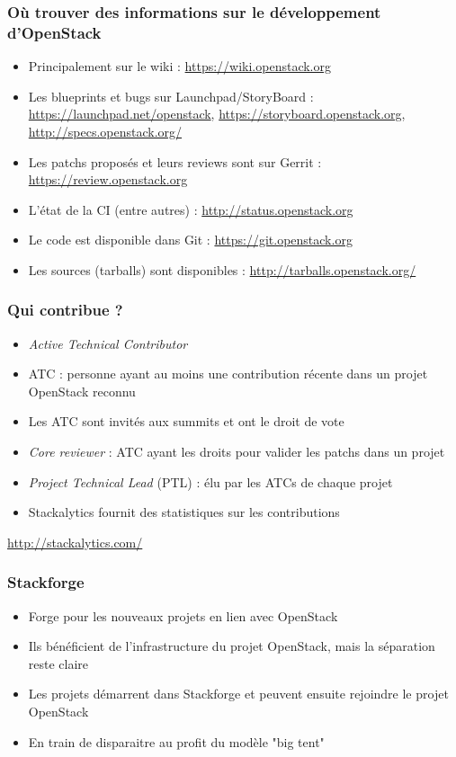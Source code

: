   \begin{frame}
    \frametitle{Où trouver des informations sur le développement d'OpenStack}
    \begin{itemize}
      \item Principalement sur le wiki : \url{https://wiki.openstack.org}
      \item Les blueprints et bugs sur Launchpad/StoryBoard : \url{https://launchpad.net/openstack}, \url{https://storyboard.openstack.org}, \url{http://specs.openstack.org/}
      \item Les patchs proposés et leurs reviews sont sur Gerrit : \url{https://review.openstack.org}
      \item L'état de la CI (entre autres) : \url{http://status.openstack.org}
      \item Le code est disponible dans Git : \url{https://git.openstack.org}
      \item Les sources (tarballs) sont disponibles : \url{http://tarballs.openstack.org/}
    \end{itemize}
  \end{frame}

  \begin{frame}
    \frametitle{Qui contribue ?}
    \begin{itemize}
      \item \textit{Active Technical Contributor}
      \item ATC : personne ayant au moins une contribution récente dans un projet OpenStack reconnu
      \item Les ATC sont invités aux summits et ont le droit de vote
      \item \textit{Core reviewer} : ATC ayant les droits pour valider les patchs dans un projet
      \item \textit{Project Technical Lead} (PTL) : élu par les ATCs de chaque projet
      \item Stackalytics fournit des statistiques sur les contributions
    \end{itemize}
    \url{http://stackalytics.com/}
  \end{frame}

  \begin{frame}
    \frametitle{Stackforge}
    \begin{itemize}
      \item Forge pour les nouveaux projets en lien avec OpenStack
      \item Ils bénéficient de l'infrastructure du projet OpenStack, mais la séparation reste claire
      \item Les projets démarrent dans Stackforge et peuvent ensuite rejoindre le projet OpenStack
      \item En train de disparaitre au profit du modèle "big tent"
    \end{itemize}
  \end{frame}

